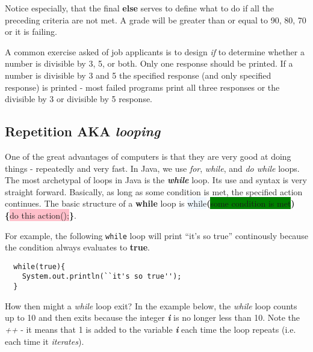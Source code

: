\documentclass{article}
\begin{document}
\begin{flushleft}
Notice especially, that the final \textbf{else} serves to define what to do if all the preceding criteria are not met. A grade will be greater than or equal to 90, 80, 70 or it is failing.\par

A common exercise asked of job applicants is to design  \emph{if} to determine whether a number is divisible by 3, 5, or both. Only one response should be printed. If a number is divisible by 3 and 5 the specified response (and only specified response) is printed - most failed programs print all three responses or the divisible by 3 or divisible by 5 response.\par




\subsection{Repetition AKA \emph{looping}}


One of the great advantages of computers is that they are very good at doing things - repeatedly and very fast. In Java, we use \emph{for}, \emph{while}, and \emph{do while} loops. The most archetypal of loops in Java is the \textbf{\emph{while}} loop. Its use and syntax is very straight forward. Basically, as long as some condition is met, the specified action continues. The basic structure of a \textbf{while} loop is \colorbox{aliceblue}{while}\textbf{(}\colorbox{green}{some condition is met}\textbf{)}\textbf{\{}\colorbox{pink}{do this action();}\textbf{\}}. \par

For example, the following \texttt{while} loop will print ``it's so true'' continously because the condition always evaluates to \textbf{true}.
\begin{verbatim}
  while(true){
    System.out.println(``it's so true''); 
  }
\end{verbatim}

How then might a \emph{while} loop exit? In the example below, the \emph{while} loop counts up to 10 and then exits because the integer \emph{\textbf{i}} is no longer less than 10. Note the \emph{++} - it means that 1 is added to the variable \textbf{\emph{i}} each time the loop repeats (i.e. each time it \emph{iterates}).


\end{flushleft}
\end{document}
